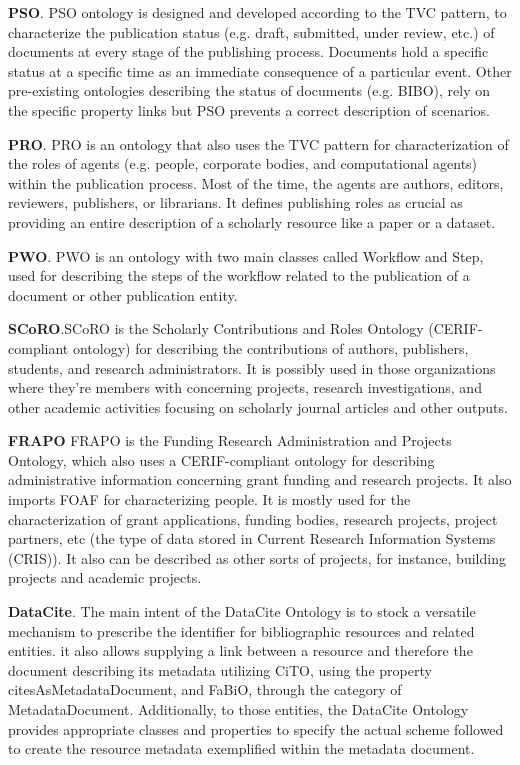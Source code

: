 \medskip
\noindent \textbf{PSO}. PSO\cite{DBLP:conf/i-semantics/PeroniSV12} ontology is designed and developed according to the TVC pattern, to characterize the publication status (e.g. draft, submitted, under review, etc.) of documents at every stage of the publishing process. Documents hold a specific status at a specific time as an immediate consequence of a particular event. Other pre-existing ontologies describing the status of documents (e.g. BIBO), rely on the specific property links but PSO prevents a correct description of scenarios.  

\medskip
\noindent \textbf{PRO}. PRO\cite{DBLP:conf/i-semantics/PeroniSV12} is an ontology that also uses the TVC pattern for characterization of the roles of agents (e.g. people, corporate bodies, and computational agents) within the publication process. Most of the time, the agents are authors, editors, reviewers, publishers, or librarians. It defines publishing roles as crucial as providing an entire description of a scholarly resource like a paper or a dataset.  

\medskip
\noindent \textbf{PWO}. PWO\cite{DBLP:journals/semweb/GangemiPSV17} is an ontology with two main classes called Workflow and Step, used for describing the steps of the workflow related to the publication of a document or other publication entity.

\medskip
\noindent \textbf{SCoRO}.SCoRO\cite{Scoro} is the Scholarly Contributions and Roles Ontology (CERIF-compliant ontology) for describing the contributions of authors, publishers, students, and research administrators. It is possibly used in those organizations where they're members with concerning projects, research investigations, and other academic activities focusing on scholarly journal articles and other outputs.

\medskip
\noindent \textbf{FRAPO} FRAPO\cite{Frapo} is the Funding Research Administration and Projects Ontology, which also uses a CERIF-compliant ontology for describing administrative information concerning grant funding and research projects. It also imports FOAF for characterizing people. It is mostly used for the characterization of grant applications, funding bodies, research projects, project partners, etc (the type of data stored in Current Research Information Systems (CRIS)). It also can be described as other sorts of projects, for instance, building projects and academic projects.

\medskip
\noindent \textbf{DataCite}. The main intent of the DataCite\cite{DataCite_Ontology} Ontology is to stock a versatile mechanism to prescribe the identifier for bibliographic resources and related entities. it also allows supplying a link between a resource and therefore the document describing its metadata utilizing CiTO, using the property citesAsMetadataDocument, and FaBiO, through the category of MetadataDocument. Additionally, to those entities, the DataCite Ontology provides appropriate classes and properties to specify the actual scheme followed to create the resource metadata exemplified within the metadata document.


